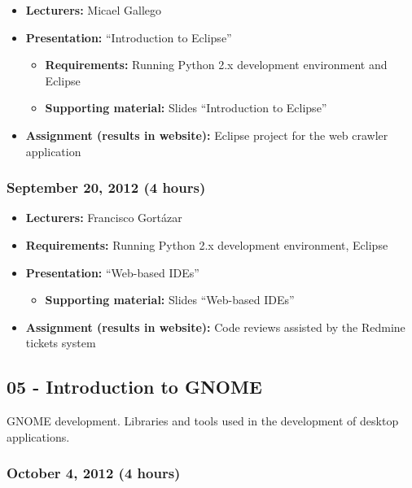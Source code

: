 \documentclass[a4paper]{article}
\begin{document}
\begin{itemize}
\item \textbf{Lecturers:} Micael Gallego
\item \textbf{Presentation:} ``Introduction to Eclipse''
  \begin{itemize}
\item \textbf{Requirements:} Running Python 2.x development
  environment and Eclipse
  \item \textbf{Supporting material:} Slides ``Introduction to Eclipse''
  \end{itemize}
\item \textbf{Assignment (results in website):} Eclipse project for
  the web crawler application
\end{itemize}

\subsubsection{September 20, 2012 (4 hours)}

\begin{itemize}
\item \textbf{Lecturers:} Francisco Gort\'azar
\item \textbf{Requirements:} Running Python 2.x development
  environment, Eclipse
\item \textbf{Presentation:} ``Web-based IDEs''
  \begin{itemize}
  \item \textbf{Supporting material:} Slides ``Web-based IDEs''
  \end{itemize}
\item \textbf{Assignment (results in website):} Code reviews assisted
  by the Redmine tickets system
\end{itemize}


\subsection{05 - Introduction to GNOME}

GNOME development. Libraries and tools used in the development of
desktop applications.

\subsubsection{October 4, 2012 (4 hours)}
\end{document}
